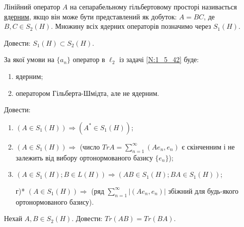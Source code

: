 \begin{theory}
    Лінійний оператор $A$ на сепарабельному гільбертовому просторі називається \underline{ядерним}, якщо він
    може бути представлений як добуток: $A = BC$, де $B, C \in S_2(H)$. Множину всіх ядерних операторів позначимо
    через $S_1(H)$.
\end{theory}

\begin{exercise}
    Довести: $S_1(H) \subset S_2(H)$.
\end{exercise}

\begin{exercise}
    За якої умови на $\{a_n\}$ оператор в $\ell_2$ із задачі \ref{N:1_5_42} буде:
    \begin{enumerate}
        \item ядерним;
        \item оператором Гільберта-Шмідта, але не ядерним.
    \end{enumerate}
\end{exercise}

\begin{exercise}
    Довести:
    \begin{enumerate}
        \item $(A \in S_1(H)) \Rightarrow (A^* \in S_1(H))$;
        \item $(A \in S_1(H)) \Rightarrow$ (число $Tr A = \sum\limits_{n = 1}^\infty (A e_n, e_n)$ є скінченним
        і не залежить від вибору ортонормованого базису $\{e_n\}$);
        \item $(A \in S_1(H); B \in L(H)) \Rightarrow (AB \in S_1(H); BA \in S_1(H))$; 
        \item[г)*] $(A \in S_1(H)) \Rightarrow$ (ряд $\sum\limits_{n = 1}^\infty |(A e_n, e_n)|$ збіжний для будь-якого ортонормованого базису).
    \end{enumerate}
\end{exercise}

\begin{exercise}
    Нехай $A, B \in S_2(H)$. Довести: $Tr (AB) = Tr (BA)$.
\end{exercise}
